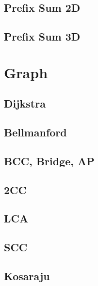 \section{Prefix Sum 2D}


\section{Prefix Sum 3D}


\chapter{Graph}
\section{Dijkstra}


\section{Bellmanford}


\section{BCC, Bridge, AP}


\section{2CC}


\section{LCA}


\section{SCC}


\section{Kosaraju}


